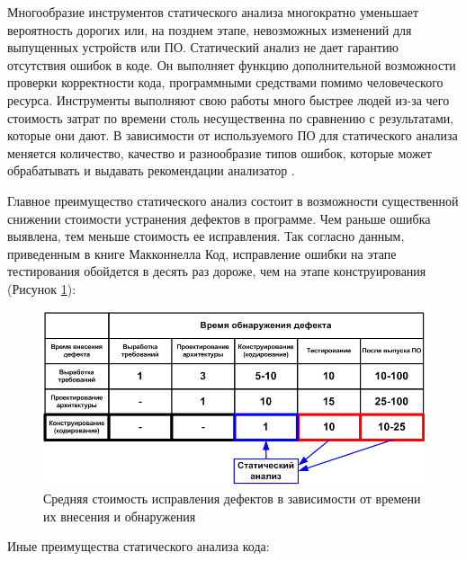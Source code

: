 Многообразие инструментов статического анализа многократно уменьшает вероятность дорогих или, на позднем этапе, невозможных изменений для выпущенных устройств или ПО. 
Статический анализ не дает гарантию отсутствия ошибок в коде. Он выполняет функцию дополнительной возможности проверки корректности кода, программными средствами помимо человеческого ресурса. Инструменты выполняют свою работы много быстрее людей из-за чего стоимость затрат по времени столь несущественна по сравнению с результатами, которые они дают. В зависимости от используемого ПО для статического анализа меняется количество, качество и разнообразие типов ошибок, которые может обрабатывать и выдавать рекомендации анализатор \cite{14}.

Главное преимущество статического анализ состоит в возможности существенной снижении стоимости устранения дефектов в программе. Чем раньше ошибка выявлена, тем меньше стоимость ее исправления. Так согласно данным, приведенным в книге Макконнелла  Код\guillemotright, исправление ошибки на этапе тестирования обойдется в десять раз дороже, чем на этапе конструирования (Рисунок \ref{fig:1}):


    \begin{figure}[!h]
    \center
    \includegraphics[width=15cm]{Images/Time to detect.png}
    \caption{Средняя стоимость исправления дефектов в зависимости от времени их внесения и обнаружения }
    \textwidth{ https://import.viva64.com/docx/terminology/Staticcodeanalysisru/image2.png}
        \label{fig:1}
    \end{figure}

Иные преимущества статического анализа кода:

